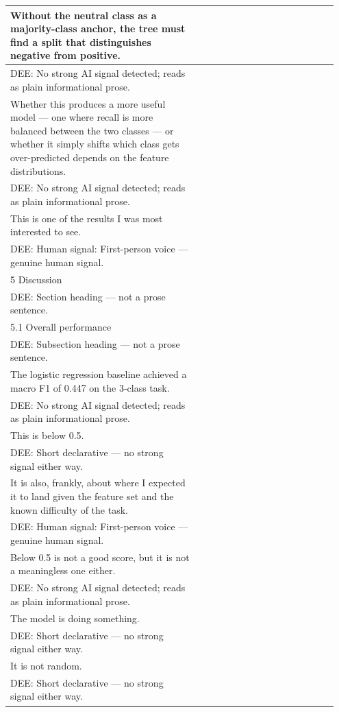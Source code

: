 \documentclass[11pt]{article}
\begin{document}
\begin{longtable}{|p{0.55\linewidth}|p{0.40\linewidth}|}
\hline
Without the neutral class as a majority-class anchor, the tree must find a split that distinguishes negative from positive. & \\[2pt]
\hline
DEE: No strong AI signal detected; reads as plain informational prose. & \\
\hline
Whether this produces a more useful model --- one where recall is more balanced between the two classes --- or whether it simply shifts which class gets over-predicted depends on the feature distributions. & \\[2pt]
\hline
DEE: No strong AI signal detected; reads as plain informational prose. & \\
\hline
This is one of the results I was most interested to see. & \\[2pt]
\hline
DEE: Human signal: First-person voice --- genuine human signal. & \\
\hline
5 Discussion & \\[2pt]
\hline
DEE: Section heading --- not a prose sentence. & \\
\hline
5.1 Overall performance & \\[2pt]
\hline
DEE: Subsection heading --- not a prose sentence. & \\
\hline
The logistic regression baseline achieved a macro F1 of 0.447 on the 3-class task. & \\[2pt]
\hline
DEE: No strong AI signal detected; reads as plain informational prose. & \\
\hline
This is below 0.5. & \\[2pt]
\hline
DEE: Short declarative --- no strong signal either way. & \\
\hline
It is also, frankly, about where I expected it to land given the feature set and the known difficulty of the task. & \\[2pt]
\hline
DEE: Human signal: First-person voice --- genuine human signal. & \\
\hline
Below 0.5 is not a good score, but it is not a meaningless one either. & \\[2pt]
\hline
DEE: No strong AI signal detected; reads as plain informational prose. & \\
\hline
The model is doing something. & \\[2pt]
\hline
DEE: Short declarative --- no strong signal either way. & \\
\hline
It is not random. & \\[2pt]
\hline
DEE: Short declarative --- no strong signal either way. & \\

\end{longtable}
\end{document}
